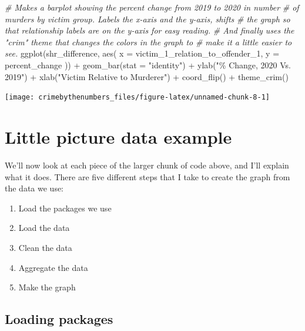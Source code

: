 \documentclass[
]{krantz}
\makeatletter
\newenvironment{Shaded}{\begin{snugshade}}{\end{snugshade}}
\newcommand{\AttributeTok}[1]{\textcolor[rgb]{0.61,0.61,0.61}{#1}}
\newcommand{\CommentTok}[1]{\textcolor[rgb]{0.37,0.37,0.37}{\textit{#1}}}
\newcommand{\FunctionTok}[1]{\textcolor[rgb]{0,0,0}{#1}}
\newcommand{\NormalTok}[1]{#1}
\newcommand{\SpecialCharTok}[1]{\textcolor[rgb]{0,0,0}{#1}}
\newcommand{\StringTok}[1]{\textcolor[rgb]{0.5,0.5,0.5}{#1}}
\providecommand{\tightlist}{%
  \setlength{\itemsep}{0pt}\setlength{\parskip}{0pt}}
\newenvironment{kframe}{%
\medskip{}
\setlength{\fboxsep}{.8em}
 \def\at@end@of@kframe{}%
 \ifinner\ifhmode%
  \def\at@end@of@kframe{\end{minipage}}%
  \begin{minipage}{\columnwidth}%
 \fi\fi%
 \def\FrameCommand##1{\hskip\@totalleftmargin \hskip-\fboxsep
 \colorbox{shadecolor}{##1}\hskip-\fboxsep
     \hskip-\linewidth \hskip-\@totalleftmargin \hskip\columnwidth}%
 \MakeFramed {\advance\hsize-\width
   \@totalleftmargin\z@ \linewidth\hsize
   \@setminipage}}%
 {\par\unskip\endMakeFramed%
 \at@end@of@kframe}
\renewenvironment{Shaded}{\begin{kframe}}{\end{kframe}}
\makeatother
\begin{document}
\begin{Shaded}
\begin{Highlighting}[]
\CommentTok{\# Makes a barplot showing the percent change from 2019 to 2020 in number}
\CommentTok{\# of murders by victim group. Labels the x{-}axis and the y{-}axis, shifts}
\CommentTok{\# the graph so that relationship labels are on the y{-}axis for easy reading.}
\CommentTok{\# And finally uses the "crim" theme that changes the colors in the graph to}
\CommentTok{\# make it a little easier to see.}
\FunctionTok{ggplot}\NormalTok{(shr\_difference, }\FunctionTok{aes}\NormalTok{(}
  \AttributeTok{x =}\NormalTok{ victim\_1\_relation\_to\_offender\_1,}
  \AttributeTok{y =}\NormalTok{ percent\_change}
\NormalTok{)) }\SpecialCharTok{+}
  \FunctionTok{geom\_bar}\NormalTok{(}\AttributeTok{stat =} \StringTok{"identity"}\NormalTok{) }\SpecialCharTok{+}
  \FunctionTok{ylab}\NormalTok{(}\StringTok{"\% Change, 2020 Vs. 2019"}\NormalTok{) }\SpecialCharTok{+}
  \FunctionTok{xlab}\NormalTok{(}\StringTok{"Victim Relative to Murderer"}\NormalTok{) }\SpecialCharTok{+}
  \FunctionTok{coord\_flip}\NormalTok{() }\SpecialCharTok{+}
  \FunctionTok{theme\_crim}\NormalTok{()}
\end{Highlighting}
\end{Shaded}

\begin{center}\texttt{[image: crimebythenumbers\_files/figure-latex/unnamed-chunk-8-1]} \end{center}

\hypertarget{little-picture-data-example}{%
\section{Little picture data
example}\label{little-picture-data-example}}

We'll now look at each piece of the larger chunk of code
above, and I'll explain what it does. There are five
different steps that I take to create the graph from the
data we use:

\begin{enumerate}
\def\labelenumi{\arabic{enumi}.}
\tightlist
\item
  Load the packages we use
\item
  Load the data
\item
  Clean the data
\item
  Aggregate the data
\item
  Make the graph
\end{enumerate}

\hypertarget{loading-packages}{%
\subsection{Loading packages}\label{loading-packages}}
\end{document}

